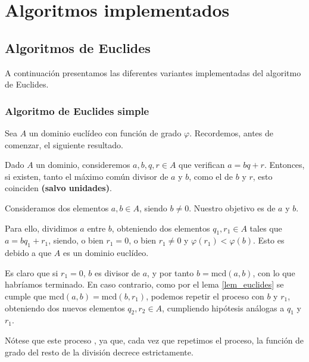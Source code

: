 \documentclass[a4paper, 11pt, twoside, notitlepage, openany, onecolumn, final]{report}
\title{\tb{Álgebra Computacional}}
\author{
	Álvaro García Tenorio
	\and
	Miguel Pascual Domínguez
}
\date{\today}
\begin{document}
	\maketitle
	\begin{abstract}
		En este documento se recopilan unas breves explicaciones sobre el funcionamiento de los algoritmos implementados.
	\end{abstract}
	\tableofcontents
	\chapter{Algoritmos implementados}
	\section{Algoritmos de Euclides}
	A continuación presentamos las diferentes variantes implementadas del algoritmo de Euclides.
	\subsection{Algoritmo de Euclides simple}
	Sea $A$ un dominio euclídeo con función de grado $\varphi$. Recordemos, antes de comenzar, el siguiente resultado.
	\begin{lem}[Euclides]
		\label{lem_euclides}
		Dado $A$ un dominio, consideremos $a,b,q,r\in A$ que verifican $a=bq+r$. Entonces, si existen, tanto el máximo común divisor de $a$ y $b$, como el de $b$ y $r$, esto coinciden \textbf{(salvo unidades)}.
	\end{lem}
	
	Consideramos dos elementos $a,b\in A$, siendo $b\not=0$. Nuestro objetivo es  de $a$ y $b$.
	
	Para ello, dividimos $a$ entre $b$, obteniendo dos elementos $q_1,r_1\in A$ tales que $a=bq_1+r_1$, siendo, o bien $r_1=0$, o bien $r_1\not=0$ y $\varphi(r_1)<\varphi(b)$. Esto es debido a que $A$ es un dominio euclídeo.
	
	Es claro que si $r_1=0$, $b$ es divisor de $a$, y por tanto $b=\text{mcd}(a,b)$, con lo que habríamos terminado. En caso contrario, como por el lema \eqref{lem_euclides} se cumple que $\text{mcd}(a,b)=\text{mcd}(b,r_1)$, podemos repetir el proceso con $b$ y $r_1$, obteniendo dos nuevos elementos $q_2,r_2\in A$, cumpliendo hipótesis análogas a $q_1$ y $r_1$.
	
	Nótese que este proceso , ya que, cada vez que repetimos el proceso, la función de grado del resto de la división decrece estrictamente.
	
\end{document}
